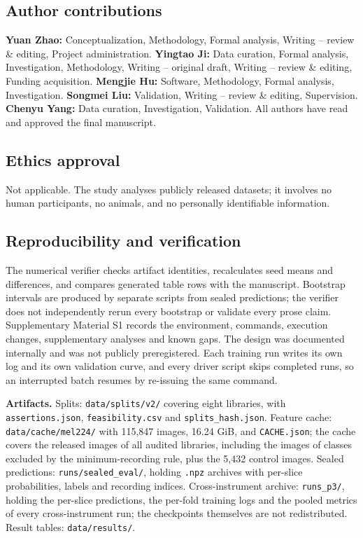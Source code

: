 \subsection*{Author contributions}

\textbf{Yuan Zhao:} Conceptualization, Methodology, Formal analysis, Writing -- review \& editing,
Project administration. \textbf{Yingtao Ji:} Data curation, Formal analysis, Investigation,
Methodology, Writing -- original draft, Writing -- review \& editing, Funding acquisition.
\textbf{Mengjie Hu:} Software, Methodology, Formal analysis, Investigation.
\textbf{Songmei Liu:} Validation, Writing -- review \& editing, Supervision.
\textbf{Chenyu Yang:} Data curation, Investigation, Validation.
All authors have read and approved the final manuscript.

\subsection*{Ethics approval}

Not applicable. The study analyses publicly released datasets; it involves no human participants,
no animals, and no personally identifiable information.

\subsection*{Reproducibility and verification}

The numerical verifier checks artifact identities, recalculates seed means and differences,
and compares generated table rows with the manuscript. Bootstrap intervals are produced by
separate scripts from sealed predictions; the verifier does not independently rerun every
bootstrap or validate every prose claim. Supplementary Material S1 records the environment,
commands, execution changes, supplementary analyses and known gaps. The design was documented
internally and was not publicly preregistered. Each training run writes its own log and its own validation curve, and every driver script
skips completed runs, so an interrupted batch resumes by re-issuing the same command.

\begin{sloppypar}
\noindent\textbf{Artifacts.}
Splits: \texttt{data/splits/v2/} covering eight libraries, with \texttt{assertions.json},
\texttt{feasibility.csv} and \texttt{splits\_hash.json}.
Feature cache: \texttt{data/cache/mel224/} with 115{,}847 images, 16.24 GiB, and
\texttt{CACHE.json}; the cache covers the released images of all audited libraries, including the
images of classes excluded by the minimum-recording rule, plus the 5{,}432 control images.
Sealed predictions: \texttt{runs/sealed\_eval/}, holding \texttt{.npz} archives with per-slice
probabilities, labels and recording indices.
Cross-instrument archive: \texttt{runs\_p3/}, holding the per-slice predictions, the per-fold
training logs and the pooled metrics of every cross-instrument run; the checkpoints themselves are
not redistributed.
Result tables: \texttt{data/results/}.
\end{sloppypar}

